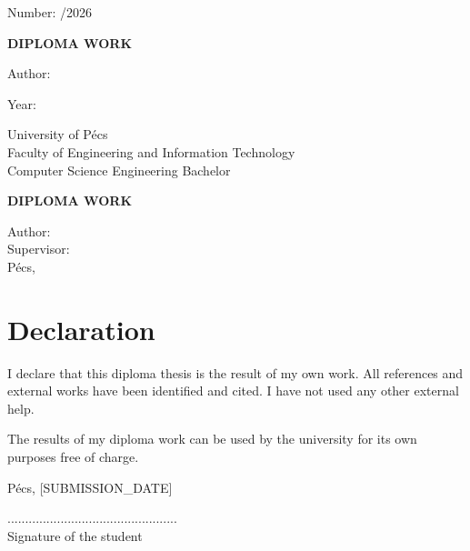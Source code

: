 \begin{titlepage}
  \centering
  \vspace*{2cm}
  {\large Number: \thesisnumber/2026\par}
  \vspace{2cm}
  {\Large\bfseries DIPLOMA WORK\par}
  \vspace{1.5cm}
  {\LARGE\bfseries \thesistitle\par}
  \vspace{2cm}
  {\large Author: \thesisauthor\par}
  \vspace{0.5cm}
  {\large Year: \thesisyear\par}
  \vfill
  University of Pécs\\
  Faculty of Engineering and Information Technology\\
  Computer Science Engineering Bachelor
\end{titlepage}

\newpage
\thispagestyle{empty}
\begin{center}
  {\Large\bfseries DIPLOMA WORK\par}
  \vspace{1cm}
  {\LARGE\bfseries \thesistitle\par}
  \vspace{2cm}
  Author: \thesisauthor\\
  Supervisor: \thesissupervisor\\
  \vfill
  Pécs, \thesisyear
\end{center}

\newpage
\chapter*{Declaration}
I declare that this diploma thesis is the result of my own work. All references and external works have been identified and cited. I have not used any other external help.

The results of my diploma work can be used by the university for its own purposes free of charge.

\vspace{2cm}
Pécs, [SUBMISSION\_DATE]

\hfill ................................................\\
\hfill Signature of the student

\tableofcontents
\newpage
